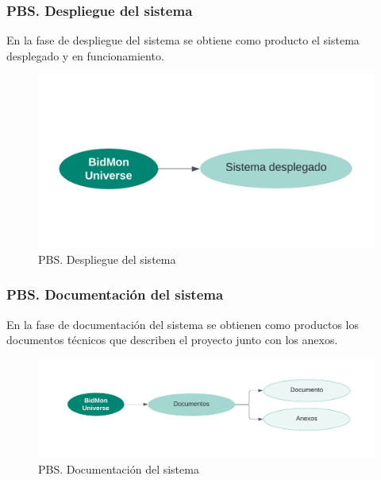 \subsubsection{PBS. Despliegue del sistema}
En la fase de despliegue del sistema se obtiene como producto el sistema desplegado y en funcionamiento.
\begin{figure}[H]
    \hypertarget{fig:5_PBS-Despliegue-Sistema}{}
    \centering
    \includegraphics[width=0.7\linewidth]{figures/5-PBS/5_PBS-Despliegue.png}
    \caption{PBS. Despliegue del sistema}
    \label{fig:5_PBS-Despliegue-Sistema}
\end{figure}


\subsubsection{PBS. Documentación del sistema}
En la fase de documentación del sistema se obtienen como productos los documentos técnicos que describen el proyecto junto con los anexos.
\begin{figure}[H]
    \hypertarget{fig:5_PBS-Documentación-Sistema}{}
    \centering
    \includegraphics[width=0.7\linewidth]{figures/5-PBS/5_PBS-Documento.png}
    \caption{PBS. Documentación del sistema}
    \label{fig:5_PBS-Documentación-Sistema}
\end{figure}

